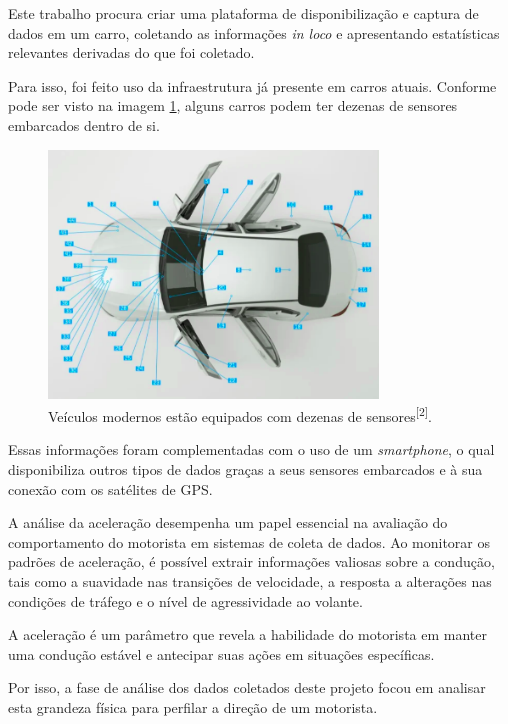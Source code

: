 Este trabalho procura criar uma plataforma de disponibilização e captura de dados em um carro, coletando as informações \textit{in loco} e apresentando estatísticas relevantes derivadas do que foi coletado.

Para isso, foi feito uso da infraestrutura já presente em carros atuais. Conforme pode ser visto na imagem \ref{fig:sensors_car}, alguns carros podem ter dezenas de sensores embarcados dentro de si.


\begin{figure}[hp]
    \centering
    
    \includegraphics[]{figures/sensores_carro.png}
    
    \caption{Veículos modernos estão equipados com dezenas de sensores\textsuperscript{[2]}.}
    
    \label{fig:sensors_car}
\end{figure}

Essas informações foram complementadas com o uso de um \textit{smartphone}, o qual disponibiliza outros tipos de dados graças a seus sensores embarcados e à sua conexão com os satélites de GPS.

A análise da aceleração desempenha um papel essencial na avaliação do comportamento do motorista em sistemas de coleta de dados. Ao monitorar os padrões de aceleração, é possível extrair informações valiosas sobre a condução, tais como a suavidade nas transições de velocidade, a resposta a alterações nas condições de tráfego e o nível de agressividade ao volante.

A aceleração é um parâmetro que revela a habilidade do motorista em manter uma condução estável e antecipar suas ações em situações específicas. 

Por isso, a fase de análise dos dados coletados deste projeto focou em analisar esta grandeza física para perfilar a direção de um motorista.

